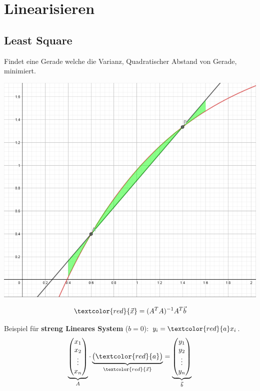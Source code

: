 \section{Linearisieren}
\subsection{Least Square}
Findet eine Gerade welche die Varianz, Quadratischer Abstand von Gerade, minimiert. 
\begin{center}
	\begin{minipage}{0.20\textwidth}
		\begin{center}
			\includegraphics[width=\linewidth,keepaspectratio=true]{Images/leastsquare}\\
		\end{center}
	\end{minipage}%
	\begin{minipage}{0.3\textwidth}
		\[\textcolor{red}{\vec{x}} = (A^TA)^{-1}A^T\vec{b}\]
	\end{minipage}
\end{center}

\noindent
Beispiel für \textbf{streng Lineares System} ($b=0$): $y_i = \textcolor{red}{a}x_i$.
\[
\underbrace{\begin{pmatrix}
		x_1 \\
		x_2 \\
		\vdots \\
		x_n
\end{pmatrix}}_{\scriptsize{A}}
\cdot
\underbrace{\begin{pmatrix}
		\textcolor{red}{a}
\end{pmatrix}}_{\scriptsize{\textcolor{red}{\vec{x}}}}
=
\underbrace{\begin{pmatrix}
		y_1 \\
		y_2 \\
		\vdots \\
		y_n
\end{pmatrix}}_{\scriptsize{\vec{b}}}
\]

